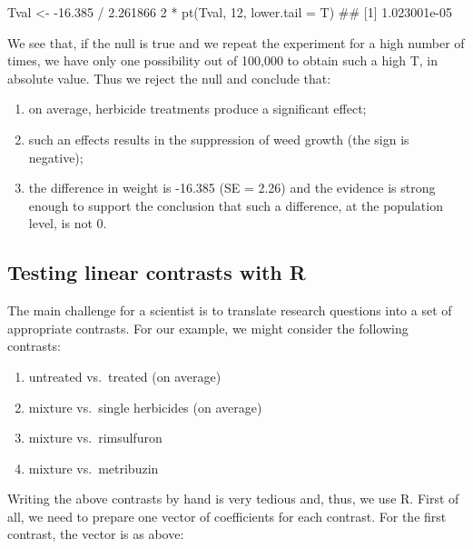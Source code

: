 \documentclass[a4paper,12pt,oneside]{book}
\providecommand{\tightlist}{%
  \setlength{\itemsep}{0pt}\setlength{\parskip}{0pt}}
\newenvironment{Shaded}{\begin{snugshade}}{\end{snugshade}}
\newcommand{\DecValTok}[1]{#1}
\newcommand{\FloatTok}[1]{#1}
\newcommand{\SpecialCharTok}[1]{#1}
\newcommand{\DocumentationTok}[1]{#1}
\newcommand{\OtherTok}[1]{#1}
\newcommand{\FunctionTok}[1]{#1}
\newcommand{\AttributeTok}[1]{#1}
\newcommand{\NormalTok}[1]{#1}
\begin{document}
\begin{Shaded}
\begin{Highlighting}[]
\NormalTok{Tval }\OtherTok{\textless{}{-}} \SpecialCharTok{{-}}\FloatTok{16.385} \SpecialCharTok{/} \FloatTok{2.261866}
\DecValTok{2} \SpecialCharTok{*} \FunctionTok{pt}\NormalTok{(Tval, }\DecValTok{12}\NormalTok{, }\AttributeTok{lower.tail =}\NormalTok{ T)}
\DocumentationTok{\#\# [1] 1.023001e{-}05}
\end{Highlighting}
\end{Shaded}

We see that, if the null is true and we repeat the experiment for a high number of times, we have only one possibility out of 100,000 to obtain such a high T, in absolute value. Thus we reject the null and conclude that:

\begin{enumerate}
\def\labelenumi{\arabic{enumi}.}
\tightlist
\item
  on average, herbicide treatments produce a significant effect;
\item
  such an effects results in the suppression of weed growth (the sign is negative);
\item
  the difference in weight is -16.385 (SE = 2.26) and the evidence is strong enough to support the conclusion that such a difference, at the population level, is not 0.
\end{enumerate}

\hypertarget{testing-linear-contrasts-with-r}{%
\subsection{Testing linear contrasts with R}\label{testing-linear-contrasts-with-r}}

The main challenge for a scientist is to translate research questions into a set of appropriate contrasts. For our example, we might consider the following contrasts:

\begin{enumerate}
\def\labelenumi{\arabic{enumi}.}
\tightlist
\item
  untreated vs.~treated (on average)
\item
  mixture vs.~single herbicides (on average)
\item
  mixture vs.~rimsulfuron
\item
  mixture vs.~metribuzin
\end{enumerate}

Writing the above contrasts by hand is very tedious and, thus, we use R. First of all, we need to prepare one vector of coefficients for each contrast. For the first contrast, the vector is as above:
\end{document}
